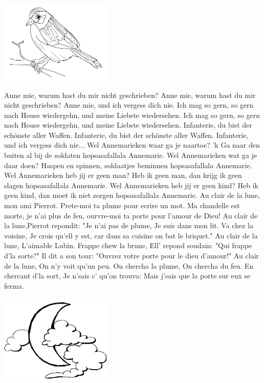 \documentclass{article}
\begin{document}
\begin{songs}{}
\endverse
\endsong
\begin{intersong}
    \includegraphics[width=0.4\textwidth]{img4}
\end{intersong}
\beginverse*
Anne mie, warum hast du mir nicht geschrieben?
Anne mie, warum hast du mir nicht geschrieben?
Anne mie, und ich vergess dich nie.
Ich mag so gern, so gern nach House wiedergehn, und meine Liebste wiedersehen.
Ich mag so gern, so gern nach House wiedergehn, und meine Liebste wiedersehen.
\endverse
\beginverse*
Infanterie, du bist der schönste aller Waffen.
Infanterie, du bist der schönste aller Waffen.
Infanterie, und ich vergess dich nie...
\endverse
\endsong
{}
\beginverse*
Wel Annemarieken waar ga je naartoe? 
'k Ga naar den buiten al bij de soldaten hopsasafallala Annemarie. 
\endverse
\beginverse*
Wel Annemarieken wat ga je daar doen? 
Haspen en spinnen, soldaatjes beminnen hopsasafallala Annemarie. 
\endverse
\beginverse*
Wel Annemarieken heb jij er geen man? 
Heb ik geen man, dan krijg ik geen slagen hopsasafallala Annemarie. 
\endverse
\beginverse*
Wel Annemarieken heb jij er geen kind? 
Heb ik geen kind, dan moet ik niet zorgen hopsasafallala Annemarie. 
\endverse
\endsong
{}
\beginverse*
Au clair de la lune, mon ami Pierrot. Prete-moi ta plume pour ecrire un mot. Ma chandelle est morte, je n'ai plus de feu, ourvre-moi ta porte pour l'amour de Dieu!
\endverse
\beginverse*
Au clair de la lune,Pierrot repondit: "Je n'ai pas de plume, Je suis dans mon lit. Va chez la voisine, Je crois qu'ell y est, car dans sa cuisine on bat le briquet."
\endverse
\beginverse*
Au clair de la lune, L'aimable Lubin. Frappe chew la brune, Ell' repond soudain: "Qui frappe d'la sorte?" Il dit a son tour: "Ouvrez votre porte pour le dieu d'amour!"
\endverse
\beginverse*
Au clair de la lune, On n'y voit qu'un peu. On chercha la plume, On chercha du feu. En chercant d'la sort, Je n'sais c' qu'on trouva: Mais j'sais que la porte  sur eux se ferma.
\endverse
\endsong
\begin{intersong}
    \includegraphics[width=0.4\textwidth]{img5}

\end{intersong}
\end{songs}
\end{document}
